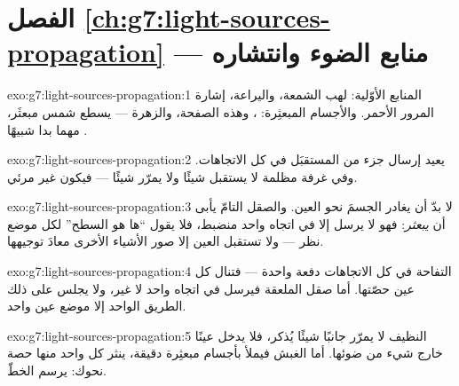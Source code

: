 \section*{الفصل \ref{ch:g7:light-sources-propagation} --- منابع الضوء وانتشاره}

\begin{solution}{exo:g7:light-sources-propagation:1}
المنابع الأوّلية: لهب الشمعة، واليراعة،  إشارة المرور
الأحمر. والأجسام المبعثِرة: ، وهذه الصفحة، والزهرة ---
 يسطع  شمس مبعثَر، مهما بدا شبيهًا .
\end{solution}

\begin{solution}{exo:g7:light-sources-propagation:2}
يعيد إرسال جزء من  المستقبَل في كل الاتجاهات. وفي غرفة
مظلمة لا يستقبل شيئًا ولا يمرّر شيئًا --- فيكون غير مرئي.
\end{solution}

\begin{solution}{exo:g7:light-sources-propagation:3}
لا بدّ أن يغادر  الجسمَ نحو العين. والصقل التامّ يأبى أن
\emph{يبعثر}: فهو لا يرسل  إلا في اتجاه واحد منضبط، فلا
يقول  ``ها هو السطح'' لكل موضع نظر --- ولا تستقبل العين إلا
صور الأشياء الأخرى معادَ توجيهها.
\end{solution}

\begin{solution}{exo:g7:light-sources-propagation:4}
التفاحة  في كل الاتجاهات دفعة واحدة --- فتنال كل عين
حصّتها. أما صقل الملعقة فيرسل   في اتجاه واحد لا
غير، ولا يجلس على ذلك الطريق الواحد إلا موضع عين واحد.
\end{solution}

\begin{solution}{exo:g7:light-sources-propagation:5}
 النظيف لا يمرّر جانبًا شيئًا يُذكر، فلا يدخل عينًا خارج
  شيء من ضوئها. أما الغبش فيملأ  بأجسام
مبعثِرة دقيقة، ينثر كل واحد منها حصة نحوك:  يرسم
الخطّ.
\end{solution}

